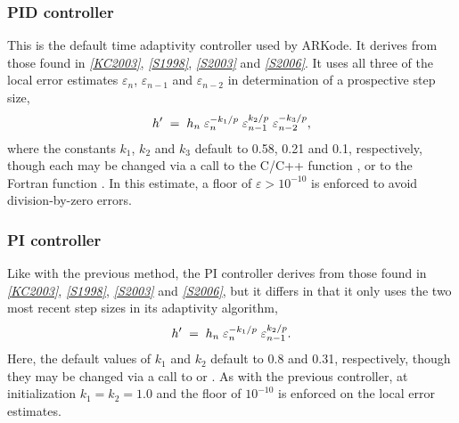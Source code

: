 \documentclass[letterpaper,10pt,english]{sphinxmanual}
\begin{document}
\subsubsection{PID controller}
\label{Mathematics:mathematics-adaptivity-errorcontrol-pid}\label{Mathematics:pid-controller}
This is the default time adaptivity controller used by ARKode.  It
derives from those found in \label{Mathematics:id8}{\hyperref[References:kc2003]{\emph{{[}KC2003{]}}}}, \label{Mathematics:id9}{\hyperref[References:s1998]{\emph{{[}S1998{]}}}}, \label{Mathematics:id10}{\hyperref[References:s2003]{\emph{{[}S2003{]}}}} and
\label{Mathematics:id11}{\hyperref[References:s2006]{\emph{{[}S2006{]}}}}.  It uses all three of the local error estimates
\(\varepsilon_n\), \(\varepsilon_{n-1}\) and
\(\varepsilon_{n-2}\) in determination of a prospective step size,
\begin{gather}
\begin{split}h' \;=\; h_n\; \varepsilon_n^{-k_1/p}\; \varepsilon_{n-1}^{k_2/p}\;
     \varepsilon_{n-2}^{-k_3/p},\end{split}\notag
\end{gather}
where the constants \(k_1\), \(k_2\) and \(k_3\) default
to 0.58, 0.21 and 0.1, respectively, though each may be changed via a
call to the C/C++ function {\hyperref[c_interface/User_callable:c.ARKodeSetAdaptivityMethod]{\emph{}}}, or
to the Fortran function {\hyperref[f_interface/Usage:f/_/FARKSETADAPTIVITYMETHOD]{\emph{}}}.  In this
estimate, a floor of \(\varepsilon > 10^{-10}\) is enforced to
avoid division-by-zero errors.


\subsubsection{PI controller}
\label{Mathematics:pi-controller}\label{Mathematics:mathematics-adaptivity-errorcontrol-pi}
Like with the previous method, the PI controller derives from those
found in \label{Mathematics:id12}{\hyperref[References:kc2003]{\emph{{[}KC2003{]}}}}, \label{Mathematics:id13}{\hyperref[References:s1998]{\emph{{[}S1998{]}}}}, \label{Mathematics:id14}{\hyperref[References:s2003]{\emph{{[}S2003{]}}}} and \label{Mathematics:id15}{\hyperref[References:s2006]{\emph{{[}S2006{]}}}}, but it differs in
that it only uses the two most recent step sizes in its adaptivity
algorithm,
\begin{gather}
\begin{split}h' \;=\; h_n\; \varepsilon_n^{-k_1/p}\; \varepsilon_{n-1}^{k_2/p}.\end{split}\notag
\end{gather}
Here, the default values of \(k_1\) and \(k_2\) default
to 0.8 and 0.31, respectively, though they may be changed via a
call to {\hyperref[c_interface/User_callable:c.ARKodeSetAdaptivityMethod]{\emph{}}} or
{\hyperref[f_interface/Usage:f/_/FARKSETADAPTIVITYMETHOD]{\emph{}}}.  As with the previous controller,
at initialization \(k_1 = k_2 = 1.0\) and the floor of
\(10^{-10}\) is enforced on the local error estimates.
\end{document}
